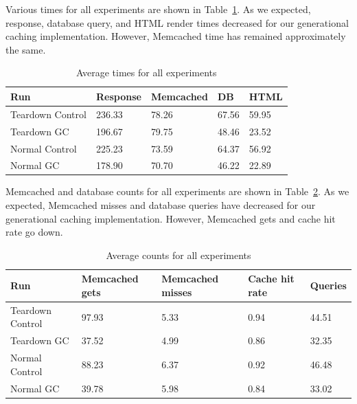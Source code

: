 \documentclass[12pt]{ucthesis}
\begin{document}
Various times for all experiments are shown in Table~\ref{tab:averageExperimentTimes}.
As we expected, response, database query, and HTML render times decreased for our generational caching implementation.
However, \textsf{Memcached} time has remained approximately the same.

\begin{table}[h]
\begin{center}
\begin{tabular}{| l | l | l | l | l |}
   \hline
   Run & Response & Memcached & DB & HTML \\ \hline
   Teardown Control & 236.33 & 78.26 & 67.56 & 59.95 \\ \hline
   Teardown GC & 196.67 & 79.75 & 48.46 & 23.52 \\ \hline
   \hline
   Normal Control & 225.23 & 73.59 & 64.37 & 56.92 \\ \hline
   Normal GC & 178.90 & 70.70 & 46.22 & 22.89 \\
   \hline
\end{tabular}
\end{center}
\caption{Average times for all experiments}
\label{tab:averageExperimentTimes}
\end{table}

\textsf{Memcached} and database counts for all experiments are shown in Table~\ref{tab:averageExperimentCounts}.
As we expected, \textsf{Memcached} misses and database queries have decreased for our generational caching implementation.
However, \textsf{Memcached} gets and cache hit rate go down.

\begin{table}[h]
\begin{center}
\begin{tabular}{| l | l | l | l | l |}
   \hline
   Run & Memcached gets & Memcached misses & Cache hit rate & Queries \\ \hline
   Teardown Control & 97.93 & 5.33 & 0.94 & 44.51 \\ \hline
   Teardown GC & 37.52 & 4.99 & 0.86 & 32.35 \\ \hline
   \hline
   Normal Control & 88.23 & 6.37 & 0.92 & 46.48 \\ \hline
   Normal GC & 39.78 & 5.98 & 0.84 & 33.02 \\
   \hline
\end{tabular}
\end{center}
\caption{Average counts for all experiments}
\label{tab:averageExperimentCounts}
\end{table}
\end{document}
